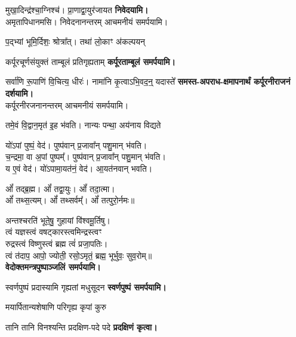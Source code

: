 \begin{center}
{मुखा॒दिन्द्र॑श्चा॒ग्निश्च॑। प्रा॒णाद्वा॒युर॑जायत}
\textbf{\devAya{} \blank{} निवेदयामि।}\\
{अमृतापिधानमसि। निवेदनानन्तरम् आचमनीयं समर्पयामि।}
\medskip

{प॒द्भ्यां भूमि॒र्दिशः॒ श्रोत्रा᳚त्। तथा॑ लो॒काꣳ अ॑कल्पयन्}

{कर्पूरचूर्णसंयुक्तं ताम्बूलं प्रतिगृह्यताम्}
\textbf{\devAya{} कर्पूरताम्बूलं समर्पयामि।}
\medskip

{सर्वा॑णि रू॒पाणि॑ वि॒चित्य॒ धीरः॑। नामा॑नि कृ॒त्वाऽभि॒वद॒न्॒ यदास्ते᳚}
\textbf{\devAya{} समस्त-अपराध-क्षमापनार्थं कर्पूरनीराजनं दर्शयामि।}\\
कर्पूरनीरजनानन्तरम् आचमनीयं समर्पयामि।\medskip

{तमे॒वं वि॒द्वान॒मृत॑ इ॒ह भ॑वति। नान्यः पन्था॒ अय॑नाय विद्यते}

यो॑ऽपां पुष्पं॒ वेद॑। पुष्प॑वान् प्र॒जावा᳚न् पशु॒मान् भ॑वति।\\
च॒न्द्रमा॒ वा अ॒पां पुष्पम्᳚। पुष्प॑वान् प्र॒जावा᳚न् पशु॒मान् भ॑वति।\\
य ए॒वं वेद॑। यो॑ऽपामा॒यत॑नं॒ वेद॑। आ॒यत॑नवान् भवति।\medskip

ओं᳚ तद्ब्र॒ह्म। ओं᳚ तद्वा॒युः। ओं᳚ तदा॒त्मा।\\ ओं᳚ तथ्स॒त्यम्‌।
ओं᳚ तथ्सर्वम्᳚‌। ओं᳚ तत्पुरो॒र्नमः॥\medskip

अन्तश्चरति॑ भूते॒षु॒ गुहायां वि॑श्वमू॒र्तिषु।\\
त्वं यज्ञस्त्वं वषट्कारस्त्वमिन्द्रस्त्वꣳ\\ रुद्रस्त्वं विष्णुस्त्वं ब्रह्म त्वं॑ प्रजा॒पतिः।\\
त्वं त॑दाप॒ आपो॒ ज्योती॒ रसो॒ऽमृतं॒ ब्रह्म॒ भूर्भुवः॒ सुव॒रोम्‌॥\\
\textbf{\devAya{} वेदोक्तमन्त्रपुष्पाञ्जलिं समर्पयामि।}
\medskip

{स्वर्णपुष्पं प्रदास्यामि गृह्यतां मधुसूदन}
\textbf{\devAya{} स्वर्णपुष्पं समर्पयामि।}
\medskip
\medskip

{मयार्पितान्यशेषाणि परिगृह्य कृपां कुरु}

{तानि तानि विनश्यन्ति प्रदक्षिण-पदे पदे}
\textbf{प्रदक्षिणं कृत्वा।}
\medskip


\end{center}
